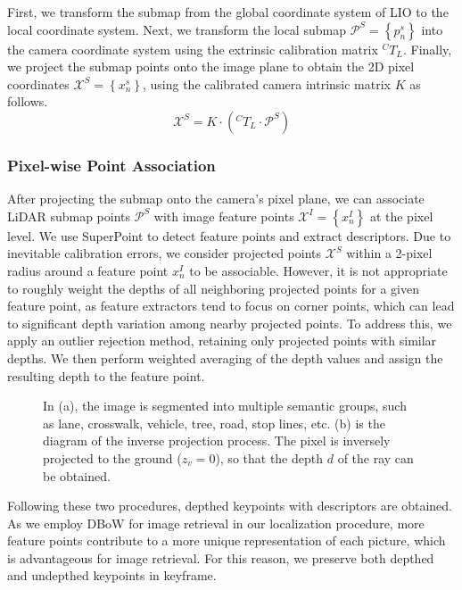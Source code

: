 \documentclass[conference]{./support/ieeeconf}
\begin{document}
First, we transform the submap from the global coordinate system of LIO to the local coordinate system. Next, we transform the local submap $\mathcal{P}^S = \left\{ p^s_n \right\}$ into the camera coordinate system using the extrinsic calibration matrix $^CT_L$. Finally, we project the submap points onto the image plane to obtain the 2D pixel coordinates $\mathcal{X}^S = \left\{ x^s_n \right\} $, using the calibrated camera intrinsic matrix $K$ as follows.
\begin{equation} \mathcal{X}^S = K \cdot ( ^CT_L \cdot \mathcal{P}^S ) \end{equation}


\subsubsection{Pixel-wise Point Association}

After projecting the submap onto the camera's pixel plane, we can associate LiDAR submap points $\mathcal{P}^S$ with image feature points $\mathcal{X}^I =  \left\{ x^I_n \right\}$ at the pixel level. We use SuperPoint\cite{detone2018superpoint} to detect feature points and extract descriptors. Due to inevitable calibration errors, we consider projected points $\mathcal{X}^S$ within a 2-pixel radius around a feature point $x^I_n$ to be associable. However, it is not appropriate to roughly weight the depths of all neighboring projected points for a given feature point, as feature extractors tend to focus on corner points, which can lead to significant depth variation among nearby projected points. To address this, we apply an outlier rejection method, retaining only projected points with similar depths. We then perform weighted averaging of the depth values and assign the resulting depth to the feature point.

\begin{figure}[h]
	\centering
	\caption{In (a), the image is segmented into multiple semantic groups, such as lane, crosswalk, vehicle, tree, road, stop lines, etc. (b) is the diagram of the inverse projection process. The pixel is inversely projected to the ground ($z_v = 0$), so that the depth $d$ of the ray can be obtained.} 
	\label{fig:segmentation_projection}
\end{figure}
Following these two procedures, depthed keypoints with descriptors are obtained.  As we employ DBoW for image retrieval in our localization procedure, more feature points contribute to a more unique representation of each picture,  which is advantageous for image retrieval. For this reason, we preserve both depthed and undepthed keypoints in keyframe.
\end{document}
